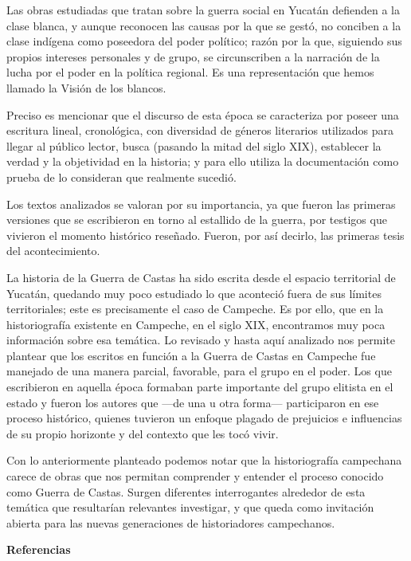 Las obras estudiadas que tratan sobre la guerra social en Yucatán defienden
a la clase  blanca, y aunque reconocen las causas por la que se gestó, no
conciben a la clase indígena como poseedora del poder político; razón por
la que, siguiendo sus propios intereses personales y de grupo, se
circunscriben a la narración de la lucha por el poder en la política
regional. Es una representación que hemos llamado la Visión de los
blancos.

\enlargethispage{1\baselineskip}
Preciso es mencionar que el discurso de esta época se caracteriza por poseer
una escritura lineal, cronológica, con diversidad de géneros literarios
utilizados para llegar al público lector, busca (pasando la mitad del siglo
XIX), establecer la verdad y la objetividad en la historia; y para ello
utiliza la documentación como prueba de lo consideran  que realmente
sucedió.

Los textos analizados se valoran por su importancia, ya que fueron las
primeras versiones que se escribieron en torno al estallido de la guerra,
por testigos que vivieron el momento histórico reseñado. Fueron, por así
decirlo, las primeras tesis del acontecimiento.

La historia de la Guerra de Castas ha sido escrita desde el espacio
territorial de Yucatán, quedando muy poco estudiado lo que aconteció fuera
de sus límites territoriales; este es precisamente el caso de Campeche. Es
por ello, que en la historiografía existente en Campeche, en el siglo XIX, 
encontramos muy poca información sobre esa temática.  Lo revisado y hasta
aquí analizado nos permite plantear que los escritos en función a la Guerra
de Castas en Campeche fue manejado de una manera parcial, favorable, para
el grupo en el poder. Los que escribieron en aquella época  formaban parte
importante del grupo elitista en el estado y fueron los autores que ---de una
u otra forma--- participaron en ese proceso histórico, quienes tuvieron un
enfoque plagado de prejuicios e influencias de su propio horizonte y del
contexto que les tocó vivir.

Con lo anteriormente planteado podemos notar que la historiografía
campechana carece de obras que nos permitan comprender y entender el
proceso conocido como Guerra de Castas. Surgen diferentes interrogantes
alrededor de esta temática que resultarían relevantes investigar, y que
queda como invitación abierta para las nuevas generaciones de historiadores
campechanos.
\newpage

\textbf{Referencias}

